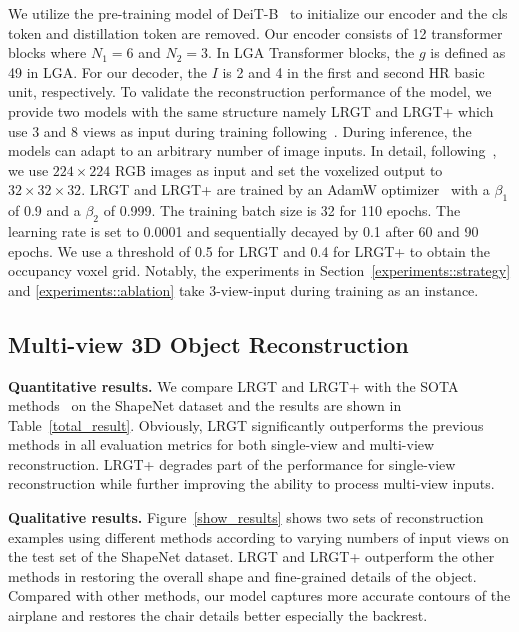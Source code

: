 \documentclass[10pt,twocolumn,letterpaper]{article}
\begin{document}
We utilize the pre-training model of DeiT-B~\cite{touvron2021training} to initialize our encoder and the cls token and distillation token are removed. Our encoder consists of 12 transformer blocks where $N_{1}=6$ and $N_{2}=3$. In LGA Transformer blocks, the $g$ is defined as 49 in LGA. For our decoder, the $I$ is 2 and 4 in the first and second HR basic unit, respectively. To validate the reconstruction performance of the model, we provide two models with the same structure namely LRGT and LRGT+ which use 3 and 8 views as input during training following~\cite{zhu2023garnet, zhu2023umi}. During inference, the models can adapt to an arbitrary number of image inputs. In detail, following~\cite{xie2020pix2vox++}, we use $224\times 224$ RGB images as input and set the voxelized output to $32 \times 32 \times 32$. LRGT and LRGT+ are trained by an AdamW optimizer~\cite{loshchilov2018decoupled} with a $\beta_1$ of 0.9 and a $\beta_2$ of 0.999. The training batch size is 32 for 110 epochs. The learning rate is set to 0.0001 and sequentially decayed by 0.1 after 60 and 90 epochs. We use a threshold of 0.5 for LRGT and 0.4 for LRGT+ to obtain the occupancy voxel grid. Notably, the experiments in Section~\ref{experiments::strategy} and \ref{experiments::ablation} take 3-view-input during training as an instance.

\subsection{Multi-view 3D Object Reconstruction}
\textbf{Quantitative results.} We compare LRGT and LRGT+ with the SOTA methods~\cite{choy20163d,yang2020robust,xie2020pix2vox++,wang2021multi,yagubbayli2021legoformer,shi20213d,zhu2023umi,zhu2023garnet} on the ShapeNet dataset and the results are shown in Table~\ref{total_result}. Obviously, LRGT significantly outperforms the previous methods in all evaluation metrics for both single-view and multi-view reconstruction. LRGT+ degrades part of the performance for single-view reconstruction while further improving the ability to process multi-view inputs.



\textbf{Qualitative results.} Figure~\ref{show_results} shows two sets of reconstruction examples using different methods according to varying numbers of input views on the test set of the ShapeNet dataset. LRGT and LRGT+ outperform the other methods in restoring the overall shape and fine-grained details of the object. Compared with other methods, our model captures more accurate contours of the airplane and restores the chair details better especially the backrest.
\end{document}
